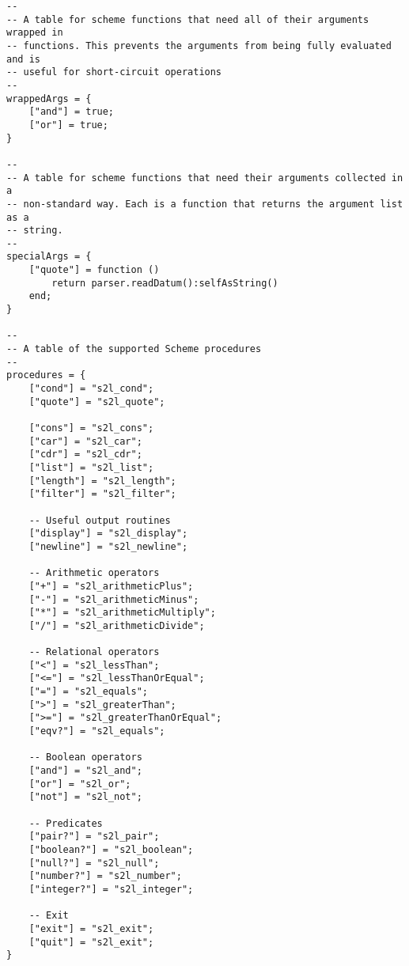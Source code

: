 \begin{verbatim}
--
-- A table for scheme functions that need all of their arguments wrapped in
-- functions. This prevents the arguments from being fully evaluated and is
-- useful for short-circuit operations
--
wrappedArgs = {
    ["and"] = true;
    ["or"] = true;
}

--
-- A table for scheme functions that need their arguments collected in a
-- non-standard way. Each is a function that returns the argument list as a
-- string.
--
specialArgs = {
    ["quote"] = function ()
        return parser.readDatum():selfAsString()
    end;
}

--
-- A table of the supported Scheme procedures
--
procedures = {
    ["cond"] = "s2l_cond";
    ["quote"] = "s2l_quote";

    ["cons"] = "s2l_cons";
    ["car"] = "s2l_car";
    ["cdr"] = "s2l_cdr";
    ["list"] = "s2l_list";
    ["length"] = "s2l_length";
    ["filter"] = "s2l_filter";

    -- Useful output routines
    ["display"] = "s2l_display";
    ["newline"] = "s2l_newline";

    -- Arithmetic operators
    ["+"] = "s2l_arithmeticPlus";
    ["-"] = "s2l_arithmeticMinus";
    ["*"] = "s2l_arithmeticMultiply";
    ["/"] = "s2l_arithmeticDivide";

    -- Relational operators
    ["<"] = "s2l_lessThan";
    ["<="] = "s2l_lessThanOrEqual";
    ["="] = "s2l_equals";
    [">"] = "s2l_greaterThan";
    [">="] = "s2l_greaterThanOrEqual";
    ["eqv?"] = "s2l_equals";

    -- Boolean operators
    ["and"] = "s2l_and";
    ["or"] = "s2l_or";
    ["not"] = "s2l_not";

    -- Predicates
    ["pair?"] = "s2l_pair";
    ["boolean?"] = "s2l_boolean";
    ["null?"] = "s2l_null";
    ["number?"] = "s2l_number";
    ["integer?"] = "s2l_integer";

    -- Exit
    ["exit"] = "s2l_exit";
    ["quit"] = "s2l_exit";
}
\end{verbatim}

